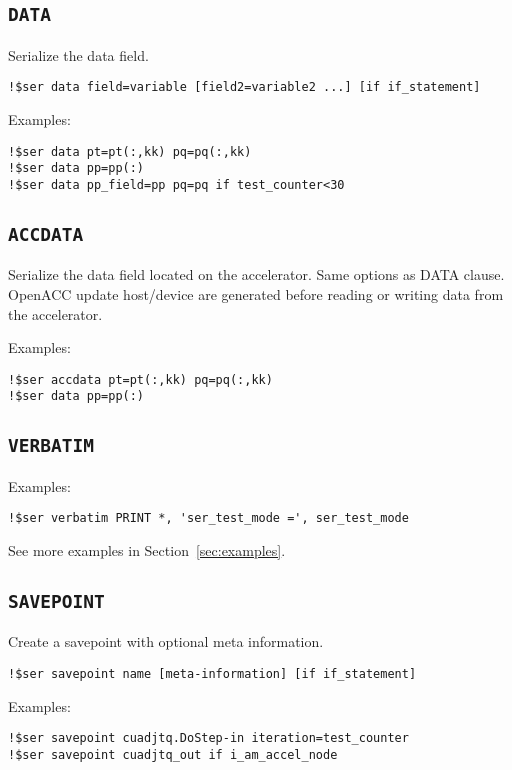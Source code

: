 \documentclass{article}
\begin{document}
\subsection{\texttt{DATA}}
Serialize the data field.

\begin{lstlisting}
!$ser data field=variable [field2=variable2 ...] [if if_statement]
\end{lstlisting}

Examples:
\begin{lstlisting}
!$ser data pt=pt(:,kk) pq=pq(:,kk)
!$ser data pp=pp(:) 
!$ser data pp_field=pp pq=pq if test_counter<30
\end{lstlisting}

\subsection{\texttt{ACCDATA}}
Serialize the data field located on the accelerator. Same options as DATA clause.
OpenACC update host/device are generated before reading
or writing data from the accelerator.

Examples:
\begin{lstlisting}
!$ser accdata pt=pt(:,kk) pq=pq(:,kk)
!$ser data pp=pp(:)
\end{lstlisting}

\subsection{\texttt{VERBATIM}}
Examples:
\begin{lstlisting}
!$ser verbatim PRINT *, 'ser_test_mode =', ser_test_mode
\end{lstlisting}

See more examples in Section~\ref{sec:examples}.

\subsection{\texttt{SAVEPOINT}}
Create a savepoint with optional meta information.

\begin{lstlisting}
!$ser savepoint name [meta-information] [if if_statement]
\end{lstlisting}

Examples:
\begin{lstlisting}
!$ser savepoint cuadjtq.DoStep-in iteration=test_counter
!$ser savepoint cuadjtq_out if i_am_accel_node
\end{lstlisting}
\end{document}

